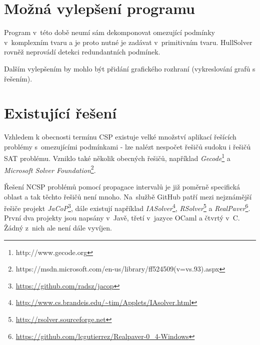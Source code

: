 \section{Možná vylepšení programu}
Program v~této době neumí sám dekomponovat omezující podmínky v~komplexním tvaru a je proto nutné je zadávat v~primitivním tvaru. HullSolver rovněž neprovádí detekci redundantních podmínek.

Dalším vylepšením by mohlo být přidání grafického rozhraní (vykreslování grafů s řešením).






\section{Existující řešení}
Vzhledem k obecnosti termínu CSP existuje velké množství aplikací řešících problémy s~omezujícími podmínkami - lze nalézt nespočet řešičů sudoku i řešičů SAT problému. Vzniklo také několik obecných řešičů, například \emph{Gecode}\footnote{http://www.gecode.org} a \emph{Microsoft Solver Foundation}\footnote{https://msdn.microsoft.com/en-us/library/ff524509(v=vs.93).aspx}.

Řešení NCSP problémů pomocí propagace intervalů je již poměrně specifická oblast a tak těchto řešičů není mnoho. Na~službě GitHub patří mezi nejznámější řešiče projekt \emph{JaCoP}\footnote{\url{https://github.com/radsz/jacop}}, dále existují například \emph{IASolver}\footnote{\url{http://www.cs.brandeis.edu/~tim/Applets/IAsolver.html}}, \emph{RSolver}\footnote{\url{http://rsolver.sourceforge.net}} a \emph{RealPaver}\footnote{\url{https://github.com/lcgutierrez/Realpaver-0\_4-Windows}}. První dva projekty jsou napsány v~Javě, třetí v~jazyce OCaml a čtvrtý v~C. Žádný z~nich ale není dále vyvíjen.
